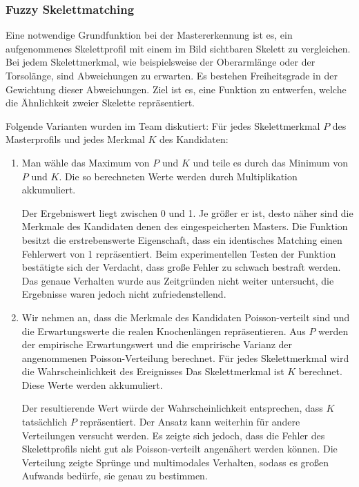 \subsubsection{Fuzzy Skelettmatching}
Eine notwendige Grundfunktion bei der Mastererkennung ist es, ein aufgenommenes Skelettprofil mit einem im Bild sichtbaren Skelett zu vergleichen.
Bei jedem Skelettmerkmal, wie beispielsweise der Oberarmlänge oder der Torsolänge, sind Abweichungen zu erwarten.
Es bestehen Freiheitsgrade in der Gewichtung dieser Abweichungen.
Ziel ist es, eine Funktion zu entwerfen, welche die Ähnlichkeit zweier Skelette repräsentiert.
\par
Folgende Varianten wurden im Team diskutiert:
Für jedes Skelettmerkmal $P$ des Masterprofils und jedes Merkmal $K$ des Kandidaten: 


\begin{enumerate}
\item Man wähle das Maximum von $P$ und $K$ und teile es durch das Minimum von $P$ und $K$. 
Die so berechneten Werte werden durch Multiplikation akkumuliert.
\par
Der Ergebniswert liegt zwischen 0 und 1.
Je größer er ist, desto näher sind die Merkmale des Kandidaten denen des eingespeicherten Masters. 
Die Funktion besitzt die erstrebenswerte Eigenschaft, dass ein identisches Matching einen Fehlerwert von 1 repräsentiert.
Beim experimentellen Testen der Funktion bestätigte sich der Verdacht, dass große Fehler zu schwach bestraft werden.
Das genaue Verhalten wurde aus Zeitgründen nicht weiter untersucht, die Ergebnisse waren jedoch nicht zufriedenstellend.
\item Wir nehmen an, dass die Merkmale des Kandidaten Poisson-verteilt sind und die Erwartungswerte die realen Knochenlängen repräsentieren.
Aus $P$ werden der empirische Erwartungswert und die emprirische Varianz der angenommenen Poisson-Verteilung berechnet.
Für jedes Skelettmerkmal wird die Wahrscheinlichkeit des Ereignisses \glqq{}Das Skelettmerkmal ist $K$\grqq{} berechnet. Diese Werte werden akkumuliert.
\par
Der resultierende Wert würde der Wahrscheinlichkeit entsprechen, dass $K$ tatsächlich $P$ repräsentiert.
Der Ansatz kann weiterhin für andere Verteilungen versucht werden.
Es zeigte sich jedoch, dass die Fehler des Skelettprofils nicht gut als Poisson-verteilt angenähert werden können.
Die Verteilung zeigte Sprünge und multimodales Verhalten, sodass es großen Aufwands bedürfe, sie genau zu bestimmen.


\end{enumerate}
